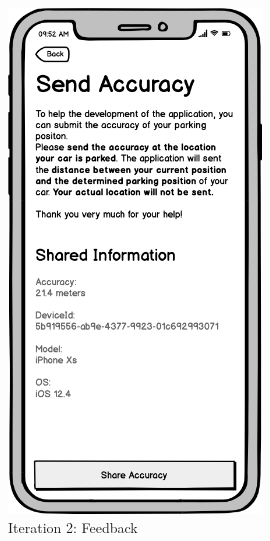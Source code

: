\begin{figure}[H]
\begin{minipage}[b]{0.45\textwidth}
    \includegraphics[width=0.6\textwidth]{images/UI/Iteration2-Feedback.png}
    \caption{Iteration 2: Feedback}
    \label{fig:i2-feedback}
  \end{minipage}
\end{figure}



